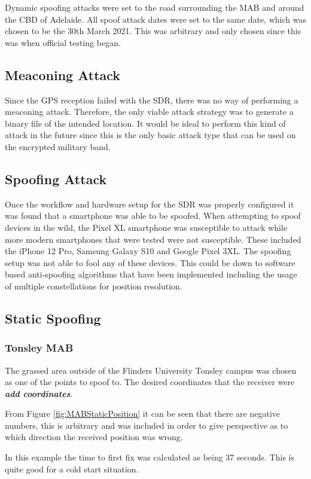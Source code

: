 Dynamic spoofing attacks were set to the road surrounding the MAB and around the CBD of Adelaide. All spoof attack dates were set to the same date, which was chosen to be
the 30th March 2021. This was arbitrary and only chosen since this was when official testing began.

\subsection{Meaconing Attack}
Since the GPS reception failed with the SDR, there was no way of performing a meaconing attack. Therefore, the only viable attack strategy was to generate a binary file
of the intended location. It would be ideal to perform this kind of attack in the future since this is the only basic attack type that can be used on the encrypted
military band.

\subsection{Spoofing Attack}
Once the workflow and hardware setup for the SDR was properly configured it was found that a smartphone was able to be spoofed.
When attempting to spoof devices in the wild, the Pixel XL smartphone was susceptible to attack while more modern smartphones that were tested were not susceptible. These
included the iPhone 12 Pro, Samsung Galaxy S10 and Google Pixel 3XL. The spoofing setup was not able to fool any of these devices. This could be down to software based
anti-spoofing algorithms that have been implemented including the usage of multiple constellations for position resolution.

\subsection{Static Spoofing}
\subsubsection{Tonsley MAB}
The grassed area outside of the Flinders University Tonsley campus was chosen as one of the points to spoof to. The desired coordinates that the receiver were
\emph{\textbf{add coordinates}}.

From Figure \ref{fig:MABStaticPosition} it can be seen that there are negative numbers, this is arbitrary and was included in order to give perspective as to which direction
the received position was wrong.

In this example the time to first fix was calculated as being 37 seconds. This is quite good for a cold start situation.

